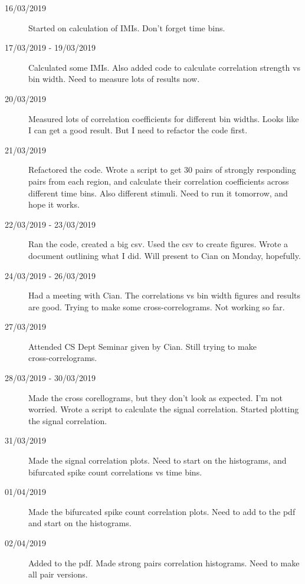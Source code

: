 \documentclass[a4paper,12pt]{article}
\theoremstyle{definition}
\begin{document}
\begin{description}
	\item[16/03/2019] Started on calculation of IMIs. Don't forget time bins.

	\item[17/03/2019 - 19/03/2019] Calculated some IMIs. Also added code to calculate correlation strength vs bin width. Need to measure lots of results now.

	\item[20/03/2019] Measured lots of correlation coefficients for different bin widths. Looks like I can get a good result. But I need to refactor the code first.

	\item[21/03/2019] Refactored the code. Wrote a script to get 30 pairs of strongly responding pairs from each region, and calculate their correlation coefficients across different time bins. Also different stimuli. Need to run it tomorrow, and hope it works.

	\item[22/03/2019 - 23/03/2019] Ran the code, created a big csv. Used the csv to create figures. Wrote a document outlining what I did. Will present to Cian on Monday, hopefully.

	\item[24/03/2019 - 26/03/2019] Had a meeting with Cian. The correlations vs bin width figures and results are good. Trying to make some cross-correlograms. Not working so far.

	\item[27/03/2019] Attended CS Dept Seminar given by Cian. Still trying to make \\ cross-correlograms.

	\item[28/03/2019 - 30/03/2019] Made the cross corellograms, but they don't look as expected. I'm not worried. Wrote a script to calculate the signal correlation. Started plotting the signal correlation.

	\item[31/03/2019] Made the signal correlation plots. Need to start on the histograms, and bifurcated spike count correlations vs time bins.

	\item[01/04/2019] Made the bifurcated spike count correlation plots. Need to add to the pdf and start on the histograms.

	\item[02/04/2019] Added to the pdf. Made strong pairs correlation histograms. Need to make all pair versions.


\end{description}
\end{document}
